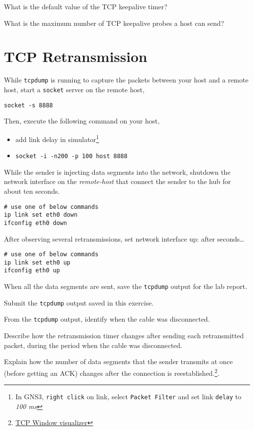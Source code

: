 \documentclass{../UTNetLab}
\begin{document}
    \begin{report}
    \item What is the default value of the TCP keepalive timer?
    
    \item What is the maximum number of TCP keepalive probes a host can send?
    \end{report}

\section{TCP Retransmission}
    While \lstinline{tcpdump} is running to capture the packets between your host and a remote host, start a \lstinline{socket} server on the remote host,
    \begin{lstlisting}
socket -s 8888
    \end{lstlisting}
    Then, execute the following command on your host,
    \begin{itemize}
        \item add link delay in simulator\footnote{In GNS3, \lstinline{right click} on link, select \lstinline{Packet Filter} and set link \lstinline{delay} to \textit{100 ms}}
        \item \lstinline[emph={host}]{socket -i -n200 -p 100 host 8888}
    \end{itemize}
    While the sender is injecting data segments into the network, shutdown the network interface on the \textit{remote-host} that connect the sender to the hub for about ten seconds.
    \begin{lstlisting}[emph={eth0}]
# use one of below commands
ip link set eth0 down
ifconfig eth0 down
    \end{lstlisting}

    After observing several retransmissions, set network interface up:
after seconds\ldots
    \begin{lstlisting}[emph={eth0}]
# use one of below commands
ip link set eth0 up
ifconfig eth0 up
    \end{lstlisting} %
    When all the data segments are sent, save the \lstinline{tcpdump} output for the lab report.
    
    \begin{report}
    \item Submit the \lstinline{tcpdump} output saved in this exercise.
    
    \item From the \lstinline{tcpdump} output, identify when the cable was disconnected.
    
    \item Describe how the retransmission timer changes after sending each retransmitted packet, during the period when the cable was disconnected.
    
    \item Explain how the number of data segments that the sender transmits at once (before getting an ACK) changes after the connection is reestablished.\footnote{\href{http://www.ccs-labs.org/teaching/rn/animations/gbn_sr/}{TCP Window visualizer}}.
    \end{report}
    
\end{document}
